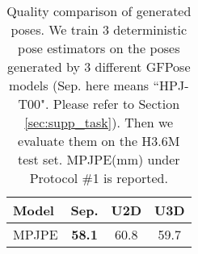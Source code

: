 \documentclass[10pt,twocolumn,letterpaper]{article}
\begin{document}
\begin{table}
    \caption{Denoising results on H3.6M dataset. We report MPJPE (mm) under Protocol \#2. ``Sep." here indicates model ``HPJ-T00". (Please refer to Section \ref{sec:supp_task}) ``Base" represents the MPJPE(mm) of noisy data. $\mathcal{N}$ and $\mathcal{U}$ denote Gaussian and uniform noise, respectively. $T$ denotes the start time of RSDE.}
    \label{table:supp_denoising}
\end{table}


\begin{table}
\centering
    \small
\setlength{\tabcolsep}{0.4cm}
        \begin{tabular}{l c c c}
            \toprule
            Model & Sep. & U2D & U3D \\
            \midrule
            MPJPE & \textbf{58.1} & 60.8 & 59.7 \\
            \bottomrule
        \end{tabular}
\caption{Quality comparison of generated poses. We train 3 deterministic pose estimators on the poses generated by 3 different GFPose models (Sep. here means ``HPJ-T00". Please refer to Section \ref{sec:supp_task}). Then we evaluate them on the H3.6M test set. MPJPE(mm) under Protocol \#1 is reported.}
    \label{table:supp_generation}
\end{table}
\end{document}
